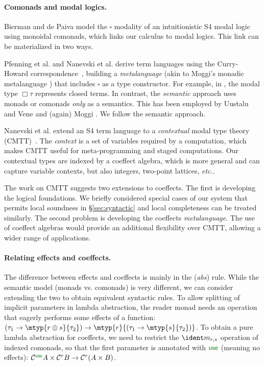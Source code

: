 \vspace{-1em}
\paragraph{Comonads and modal logics.}

Bierman and de Paiva \cite{logic-intuitionistic-modal} model the
$\square$ modality of an intuitionistic S4 modal logic using monoidal
comonads, which links our calculus to modal logics.  This link can be
materialized in two ways.

Pfenning et al. and Nanevski et al.  derive term languages using the Curry-Howard
correspondence~\cite{logic-modal-reconstruction,logic-intuitionistic-modal,logic-cmtt},
building a \emph{metalanguage} (akin to Moggi's monadic metalanguage
\cite{monad-notions}) that includes $\square$ as a type
constructor. For example, in \cite{logic-modal-reconstruction}, the
modal type $\Box \tau$ represents closed terms.
In contrast, the \emph{semantic} approach uses monads or comonads
\emph{only} as a semantics.  This has been employed by Uustalu and
Vene and (again) Moggi \cite{monad-notions,comonads-notions}.  We
follow the semantic approach.

Nanevski et al. extend an S4 term language to a \emph{contextual}
modal type theory (CMTT)~\cite{logic-cmtt}.
The \emph{context} is a set of variables required by a computation, which
makes CMTT useful for meta-programming and staged computations. Our contextual types are
indexed by a coeffect algebra, which is more general and can capture
variable contexts, but also integers, two-point lattices, \emph{etc.}.

The work on CMTT suggests two extensions to coeffects. The first is
developing the logical foundations. We briefly considered special cases
of our system that permits local soundness in \S\ref{sec:syntactic} and
local completeness can be treated similarly. The second problem is 
developing the coeffects \emph{metalanguage}. The use of coeffect algebras
would provide an additional flexibility over CMTT, allowing a wider range 
of applications.


\vspace{-1em}
\paragraph{Relating effects and coeffects.} 
The difference between effects and coeffects is mainly in the (\emph{abs}) rule. While the 
semantic model (monads vs. comonads) is very different, we can consider extending the two to 
obtain equivalent syntactic rules. To allow splitting of implicit parameters in lambda abstraction, 
the reader monad needs an operation that eagerly performs some effects of a function: 
$(\tau_1 \rightarrow \mtyp{r \oplus s}{\tau_2}) \rightarrow \mtyp{r}{(\tau_1 \rightarrow \mtyp{s}{\tau_2})}$.
To obtain a pure lambda abstraction
for coeffects, we need to restrict the $\cmerge_{r, s}$ 
operation of indexed comonads, so that the first parameter is annotated with $\cunit$ (meaning
no effects): $\ccat^{\cunit} A \times \ccat^r B \rightarrow \ccat^{r}(A \times B)$.

